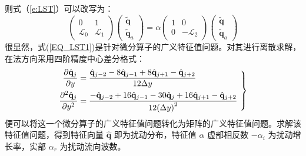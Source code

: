 则式（\ref{e:LST}）可以改写为：
\begin{equation}
  \left(
  \begin{array}{cc}
    0 & 1 \\
    \mathscr{L}_0 & \mathscr{L}_1
  \end{array}
  \right)
  \left(
  \begin{array}{c}
    \tilde{\mathbf{q}} \\
    \tilde{\mathbf{q}}_a
  \end{array}
  \right)
  =\alpha
  \left(
  \begin{array}{cc}
    1 & 0 \\
    0 & -\mathscr{L}_2
  \end{array}
  \right)
  \left(
  \begin{array}{c}
    \tilde{\mathbf{q}} \\
    \tilde{\mathbf{q}}_a
  \end{array}
  \right)
\end{equation}
很显然，式(\ref{EQ_LST1})是针对微分算子的广义特征值问题。对其进行离散求解，在法方向采用四阶精度中心差分格式：
\begin{equation}\label{EQ_CF}\left.
\begin{aligned}
    \frac{\partial{\hat{\mathbf{q}}_j}}{\partial y} &= \frac{{
    {\hat{\mathbf{q}}_{j - 2}}
    - 8{\hat{\mathbf{q}}_{j - 1}}
    + 8{\hat{\mathbf{q}}_{j + 1}}
    - {\hat{\mathbf{q}}_{j + 2}}}}{{12\Delta y}}\\
    \frac{{{\partial ^2}{\hat{\mathbf{q}}_j}}}{{\partial {y^2}}} &= \frac{{
    - {\hat{\mathbf{q}}_{j - 2}}
    + 16{\hat{\mathbf{q}}_{j - 1}}
    - 30{\hat{\mathbf{q}}_j}
    + 16{\hat{\mathbf{q}}_{j + 1}}
    - {\hat{\mathbf{q}}_{j + 2}}}}{{12{{\left( {\Delta y} \right)}^2}}}
\end{aligned}~\right\}
\end{equation}
便可以将这一个微分算子的广义特征值问题转化为矩阵的广义特征值问题。求解该特征值问题，得到特征向量 $\hat{\mathbf{q}}$ 即为扰动分布，特征值 $\alpha$ 虚部相反数 $-\alpha_i$ 为扰动增长率，实部 $\alpha_r$ 为扰动流向波数。


